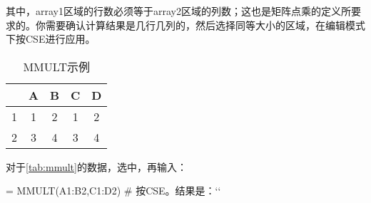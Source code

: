 其中，array1区域的行数必须等于array2区域的列数；这也是矩阵点乘的定义所要求的。你需要确认计算结果是几行几列的，然后选择同等大小的区域，在编辑模式下按CSE进行应用。

\begin{table}[!hbt]
    \centering
    \caption{MMULT示例}\label{tab:mmult}
    \begin{tabular}{c|cccc}
    \hline
      & A & B & C & D \\
    \hline
    1 & 1 & 2 & 1 & 2 \\
    2 & 3 & 4 & 3 & 4 \\
    \hline
    \end{tabular}
\end{table}

对于\autoref{tab:mmult}的数据，选中，再输入：
\begin{excode}
= MMULT(A1:B2,C1:D2)  # 按CSE。结果是：``
\end{excode}


